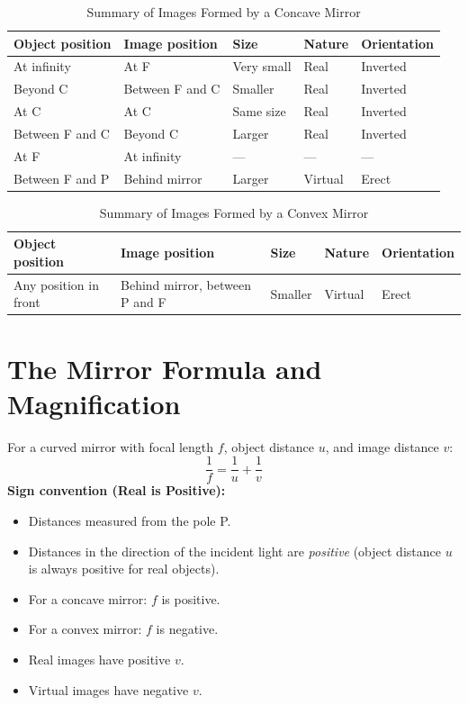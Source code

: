 \begin{table}[H]
\centering
\caption{Summary of Images Formed by a Concave Mirror}
\label{tab:concave_images}
\small
\begin{tabular}{p{3cm}p{2cm}p{2cm}p{2cm}p{2cm}}
\toprule
\textbf{Object position} & \textbf{Image position} &
\textbf{Size} & \textbf{Nature} & \textbf{Orientation}\\
\midrule
At infinity & At F & Very small & Real & Inverted\\
Beyond C & Between F and C & Smaller & Real & Inverted\\
At C & At C & Same size & Real & Inverted\\
Between F and C & Beyond C & Larger & Real & Inverted\\
At F & At infinity & --- & --- & ---\\
Between F and P & Behind mirror & Larger & Virtual & Erect\\
\bottomrule
\end{tabular}
\end{table}

\begin{table}[H]
\centering
\caption{Summary of Images Formed by a Convex Mirror}
\label{tab:convex_images}
\small
\begin{tabular}{p{3.5cm}p{3.5cm}p{2cm}p{2cm}p{2cm}}
\toprule
\textbf{Object position} & \textbf{Image position} &
\textbf{Size} & \textbf{Nature} & \textbf{Orientation}\\
\midrule
Any position in front & Behind mirror, between P and F &
  Smaller & Virtual & Erect\\
\bottomrule
\end{tabular}
\end{table}

\section{The Mirror Formula and Magnification}

\begin{lawbox}
For a curved mirror with focal length $f$, object
distance $u$, and image distance $v$:
\[
  \frac{1}{f} = \frac{1}{u} + \frac{1}{v}
\]
\textbf{Sign convention (Real is Positive):}
\begin{itemize}[noitemsep]
  \item Distances measured from the pole P.
  \item Distances in the direction of the incident
  light are \textit{positive} (object distance $u$
  is always positive for real objects).
  \item For a concave mirror: $f$ is positive.
  \item For a convex mirror: $f$ is negative.
  \item Real images have positive $v$.
  \item Virtual images have negative $v$.
\end{itemize}
\end{lawbox}

